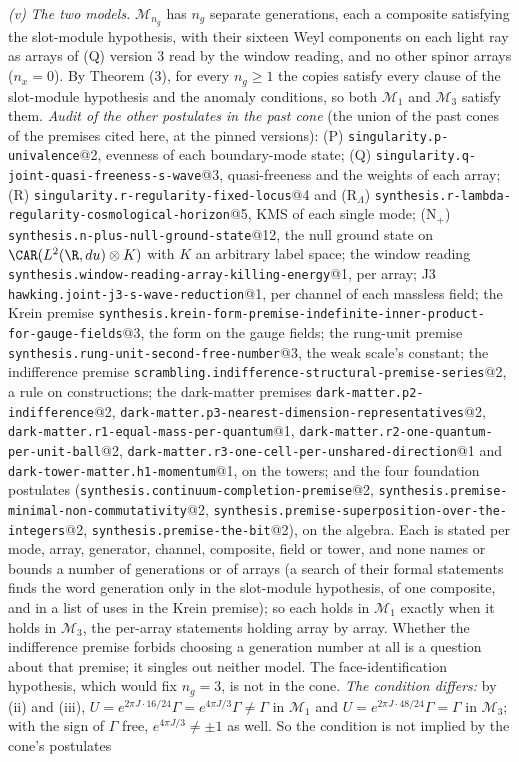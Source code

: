 \emph{(v)} \emph{The two models.} $\mathcal{M}_{n_{g}}$ has $n_{g}$ separate generations, each a composite satisfying the slot-module hypothesis, with their sixteen Weyl components on each light ray as arrays of (Q) version 3 read by the window reading, and no other spinor arrays ($n_{x} = 0$). By Theorem (3), for every $n_{g} \ge 1$ the copies satisfy every clause of the slot-module hypothesis and the anomaly conditions, so both $\mathcal{M}_{1}$ and $\mathcal{M}_{3}$ satisfy them. \emph{Audit of the other postulates in the past cone} (the union of the past cones of the premises cited here, at the pinned versions): (P) \texttt{singularity.p-univalence}@2, evenness of each boundary-mode state; (Q) \texttt{singularity.q-joint-quasi-freeness-s-wave}@3, quasi-freeness and the weights of each array; (R) \texttt{singularity.r-regularity-fixed-locus}@4 and (R$_{\Lambda}$) \texttt{synthesis.r-lambda-regularity-cosmological-horizon}@5, KMS of each single mode; (N$_{+}$) \texttt{synthesis.n-plus-null-ground-state}@12, the null ground state on $\CAR(L^{2}(\R, du) \otimes K)$ with $K$ an arbitrary label space; the window reading \texttt{synthesis.window-reading-array-killing-energy}@1, per array; J3 \texttt{hawking.joint-j3-s-wave-reduction}@1, per channel of each massless field; the Krein premise \texttt{synthesis.krein-form-premise-indefinite-inner-product-for-gauge-fields}@3, the form on the gauge fields; the rung-unit premise \texttt{synthesis.rung-unit-second-free-number}@3, the weak scale's constant; the indifference premise \texttt{scrambling.indifference-structural-premise-series}@2, a rule on constructions; the dark-matter premises \texttt{dark-matter.p2-indifference}@2, \texttt{dark-matter.p3-nearest-dimension-representatives}@2, \texttt{dark-matter.r1-equal-mass-per-quantum}@1, \texttt{dark-matter.r2-one-quantum-per-unit-ball}@2, \texttt{dark-matter.r3-one-cell-per-unshared-direction}@1 and \texttt{dark-tower-matter.h1-momentum}@1, on the towers; and the four foundation postulates (\texttt{synthesis.continuum-completion-premise}@2, \texttt{synthesis.premise-minimal-non-commutativity}@2, \texttt{synthesis.premise-superposition-over-the-integers}@2, \texttt{synthesis.premise-the-bit}@2), on the algebra. Each is stated per mode, array, generator, channel, composite, field or tower, and none names or bounds a number of generations or of arrays (a search of their formal statements finds the word generation only in the slot-module hypothesis, of one composite, and in a list of uses in the Krein premise); so each holds in $\mathcal{M}_{1}$ exactly when it holds in $\mathcal{M}_{3}$, the per-array statements holding array by array. Whether the indifference premise forbids choosing a generation number at all is a question about that premise; it singles out neither model. The face-identification hypothesis, which would fix $n_{g} = 3$, is not in the cone. \emph{The condition differs:} by (ii) and (iii), $U = e^{2\pi J\cdot 16/24}\Gamma = e^{4\pi J/3}\Gamma \neq \Gamma$ in $\mathcal{M}_{1}$ and $U = e^{2\pi J\cdot 48/24}\Gamma = \Gamma$ in $\mathcal{M}_{3}$; with the sign of $\Gamma$ free, $e^{4\pi J/3} \ne \pm 1$ as well. So the condition is not implied by the cone's postulates 